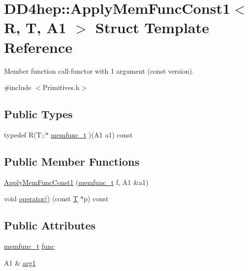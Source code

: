 \hypertarget{struct_d_d4hep_1_1_apply_mem_func_const1}{
\section{DD4hep::ApplyMemFuncConst1$<$ R, T, A1 $>$ Struct Template Reference}
\label{struct_d_d4hep_1_1_apply_mem_func_const1}
}


Member function call-\/functor with 1 argument (const version).  


{\ttfamily \#include $<$Primitives.h$>$}\subsection*{Public Types}
\begin{DoxyCompactItemize}
\item 
typedef R(T::$\ast$ \hyperlink{struct_d_d4hep_1_1_apply_mem_func_const1_a30e39ab48987d05108801d516f6793c5}{memfunc\_\-t} )(A1 a1) const 
\end{DoxyCompactItemize}
\subsection*{Public Member Functions}
\begin{DoxyCompactItemize}
\item 
\hyperlink{struct_d_d4hep_1_1_apply_mem_func_const1_a57b70099e8c5677710a247320b79c91c}{ApplyMemFuncConst1} (\hyperlink{struct_d_d4hep_1_1_apply_mem_func_const1_a30e39ab48987d05108801d516f6793c5}{memfunc\_\-t} f, A1 \&a1)
\item 
void \hyperlink{struct_d_d4hep_1_1_apply_mem_func_const1_ad9a08fd0b4b65c1b22d6ce088bad256c}{operator()} (const \hyperlink{class_t}{T} $\ast$p) const 
\end{DoxyCompactItemize}
\subsection*{Public Attributes}
\begin{DoxyCompactItemize}
\item 
\hyperlink{struct_d_d4hep_1_1_apply_mem_func_const1_a30e39ab48987d05108801d516f6793c5}{memfunc\_\-t} \hyperlink{struct_d_d4hep_1_1_apply_mem_func_const1_a924d23a16a5ec30552a0f78bcc3dee14}{func}
\item 
A1 \& \hyperlink{struct_d_d4hep_1_1_apply_mem_func_const1_a3bcafdc6a0f9deeb47c46e2a10b4fbe2}{arg1}
\end{DoxyCompactItemize}


